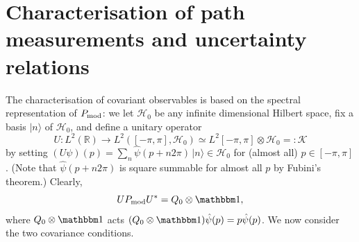 

\section{Characterisation of path measurements and uncertainty relations}
The characterisation of covariant observables is based on the spectral representation of $P_{\mathrm{mod}}$: we let $\mathcal H_0$ be any infinite dimensional Hilbert space, fix a basis $|n\rangle$ of $\mathcal H_0$, and define a unitary operator
$$U:L^2(\mathbb R) \to L^2([-\pi,\pi],\mathcal H_0)\simeq L^2[-\pi,\pi]\otimes \mathcal H_0=:\mathcal K$$
by setting $(U\psi)(p) = \sum_{n} \hat\psi(p+n2\pi) \,|n\rangle\in \mathcal H_0$ for (almost all) $p\in [-\pi,\pi]$. (Note that $\hat\psi(p+n2\pi)$ is square summable for almost all $p$ by Fubini's theorem.) Clearly,
$$
U\MOD P U^* = Q_0\otimes \id,
$$
where $Q_0\otimes \id$ acts $(Q_0\otimes \id)\hat\psi(p) = p\hat\psi(p)$. We now consider the two covariance conditions.

